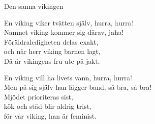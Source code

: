 \begin{song}{Den sanna vikingen}
	
	
	
	En viking viker tvätten själv, hurra, hurra!\\
	Namnet viking kommer sig därav, jaha!\\
	Föräldraledigheten delas exakt,\\
	och när herr viking barnen lagt,\\
	Då är vikingens fru ute på jakt.
	
	En viking vill ha livets vann, hurra, hurra!\\
	Men på sig själv han lägger band, så bra, så bra!\\
	Mjödet prioriteras sist,\\
	kök och städ blir aldrig trist,\\
	för vår viking, han är feminist.
	
\end{song}
